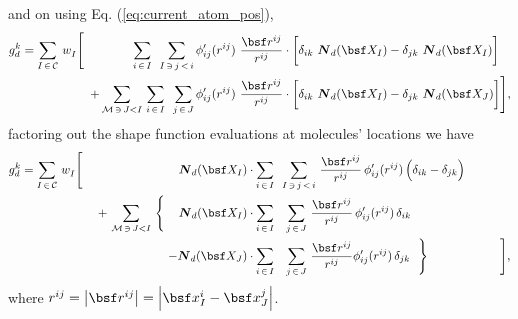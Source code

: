 \documentclass[a4paper,10pt]{article}
\newcommand{\refeq}[1]{Eq. (\ref{eq:#1})}
\def\gz  #1{           \mbox{\boldmath $\mit #1$}}
\newcommand{\norm}[1]{\left\lvert #1 \right\rvert}
\def\mcl  #1{               {\cal #1}}
\begin{document}
and on using \refeq{current_atom_pos},
\begin{align}
 g^k_d = \sum_{I \, \in \, \mcl C}  \, w^{}_I
	  \Bigg[
		\,\,\,\,\,\,\,\,\,\,\,\,\,\,\,\,\,\,\,\,\,\,\,
		\sum_{i \, \in \, I}       \,\,\,
		\sum_{I \, \ni \, j \, < \, i}       \,
		  &{\phi}^\prime_{ij} (r^{ij})\, \, 
		    \frac {\bsf r^{ij}}{r^{ij}}
		    \cdot
		    \bigg[
		      \delta_{ik} \,\, \gz N_d( \bsf X_{I})  
		      - 
		      \delta_{jk} \,\, \gz N_d( \bsf X_{I})
		    \bigg] \\
	      +
	      \sum_{\mcl M \, \ni \, J < I}  \,
	      \sum_{i \, \in \, I}       \,\,\,
	      \sum_{j \, \in \, J}       \,
		&{\phi}^\prime_{ij} (r^{ij})\, \, 
		  \frac {\bsf r^{ij}}{r^{ij}}
		  \cdot
		  \bigg[
		    \delta_{ik} \,\, \gz N_d( \bsf X_{I})  
		    - 
		    \delta_{jk} \,\, \gz N_d( \bsf X_{J})
		  \bigg]
	 \Bigg],
\end{align}
factoring out the shape function evaluations at molecules' locations we have
\begin{align}
 g^k_d = \sum_{I \, \in \, \mcl C}  \, w^{}_I
	  \Bigg[
		\,\,\,\,\,\,\,\,\,\,\,\,
		\,\,\,\,\,\,\,\,\,\,\,\,
		\,\,\,\,\,\,\,\,\,\,\,\,
		\,\,\,\,\,\,\,\,\,\,\,\,
		\gz N_d( \bsf X_{I})
		&\cdot
		  \sum_{i \, \in \, I}            \,\,\,
		  \sum_{I \, \ni \, j \, < \, i} \,
		  \frac {\bsf r^{ij}}{r^{ij}}               \,
		    {\phi}^\prime_{ij} (r^{ij})        \,
		      \Big(
			\delta_{ik} 
			- 
			\delta_{jk}
		      \Big)
		\\
	      + \,
		\sum_{\mcl M \, \ni \, J < I}  \,
		\Bigg\{
		  \,\,\,\,\,\,\,
		  \gz N_d( \bsf X_{I})
		  &\cdot
		    \sum_{i \, \in \, I}    \,\,\,\,\,
		    \sum_{j \, \in \, J}   \,
		    \frac {\bsf r^{ij}}{r^{ij}}       \,
		      {\phi}^\prime_{ij}(r^{ij}) \,
		      \delta_{ik}           \,
		    \\
		  -
		  \gz N_d( \bsf X_{J})
		  &\cdot
		    \sum_{i \, \in \, I}    \,\,\,\,\,
		    \sum_{j \, \in \, J}   \,
		    \frac{\bsf r^{ij}}{r^{ij}}
		      {\phi}^\prime_{ij}(r^{ij}) \,
		      \delta_{jk}           \,
		\,\,\,
		\Bigg\}
		\,\,\,\,\,\,\,\,\,\,\,\,
		\,\,\,\,\,\,\,\,\,\,\,\,
		\,\,\,\,\,\,\,\,\,\,\,\,
	 \Bigg],
\end{align}
where $r^{ij} = \norm{\bsf r^{ij}} = \norm{ \bsf x^{i}_{I} - \bsf x^{j}_{J} }$.
\end{document}

